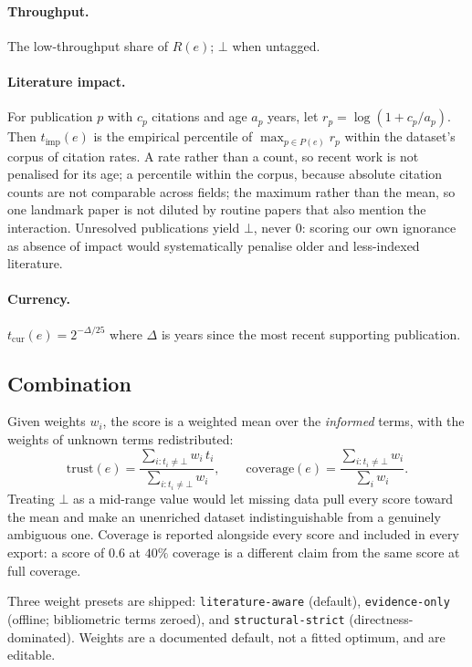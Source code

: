 \documentclass[conference]{IEEEtran}
\begin{document}
\paragraph{Throughput.} The low-throughput share of $R(e)$; $\bot$ when untagged.

\paragraph{Literature impact.} For publication $p$ with $c_p$ citations and age $a_p$
years, let $r_p = \log(1 + c_p / a_p)$. Then $t_{\mathrm{imp}}(e)$ is the empirical
percentile of $\max_{p \in P(e)} r_p$ within the dataset's corpus of citation rates. A
rate rather than a count, so recent work is not penalised for its age; a percentile
within the corpus, because absolute citation counts are not comparable across fields;
the maximum rather than the mean, so one landmark paper is not diluted by routine
papers that also mention the interaction. Unresolved publications yield $\bot$, never
$0$: scoring our own ignorance as absence of impact would systematically penalise older
and less-indexed literature.

\paragraph{Currency.} $t_{\mathrm{cur}}(e) = 2^{-\Delta/25}$ where $\Delta$ is years
since the most recent supporting publication.

\subsection{Combination}

Given weights $w_i$, the score is a weighted mean over the \emph{informed} terms, with
the weights of unknown terms redistributed:
\begin{equation}
  \mathrm{trust}(e) = \frac{\sum_{i : t_i \neq \bot} w_i\, t_i}{\sum_{i : t_i \neq \bot} w_i},
  \qquad
  \mathrm{coverage}(e) = \frac{\sum_{i : t_i \neq \bot} w_i}{\sum_i w_i}.
\end{equation}
Treating $\bot$ as a mid-range value would let missing data pull every score toward the
mean and make an unenriched dataset indistinguishable from a genuinely ambiguous one.
Coverage is reported alongside every score and included in every export: a score of
$0.6$ at $40\%$ coverage is a different claim from the same score at full coverage.

Three weight presets are shipped: \texttt{literature-aware} (default),
\texttt{evidence-only} (offline; bibliometric terms zeroed), and
\texttt{structural-strict} (directness-dominated). Weights are a documented default,
not a fitted optimum, and are editable.
\end{document}

